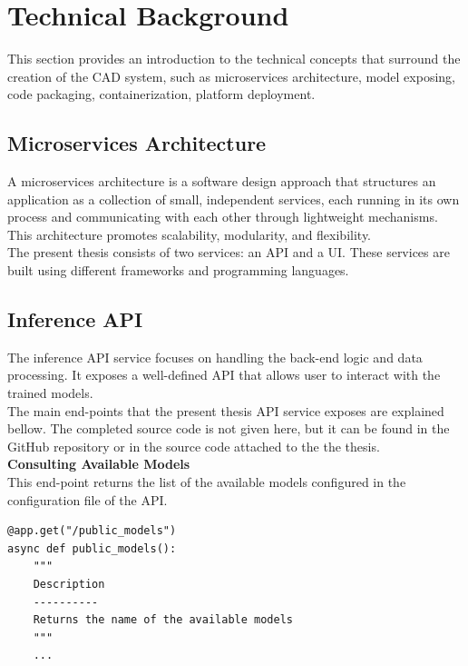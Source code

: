 \newpage

\section{Technical Background}

This section provides an introduction to the technical concepts
that surround the creation of the CAD system, such as microservices architecture, model exposing, code packaging, containerization, platform deployment.

\subsection{Microservices Architecture}

A microservices architecture is a software design approach that structures an application as a collection of small, independent services, each running in its own process and communicating with each other through lightweight mechanisms. This architecture promotes scalability, modularity, and flexibility. \\

The present thesis consists of two services: an API and a UI. These services are built using different frameworks and programming languages. 


\subsection{Inference API}

The inference API service focuses on handling the back-end logic and data processing. It exposes a well-defined API that allows user to interact with the trained models. \\

The main end-points that the present thesis API service exposes are explained bellow. The completed source code is not given here, but it can be found in the GitHub repository or in the source code attached to the the thesis. \\

\vspace{0.5cm}
\textbf{Consulting Available Models} \\

This end-point returns the list of the available models configured in the configuration file of the API.

\begin{Verbatim}[fontsize=\small]
@app.get("/public_models")
async def public_models():
    """
    Description
    ----------
    Returns the name of the available models
    """
    ...
\end{Verbatim}


